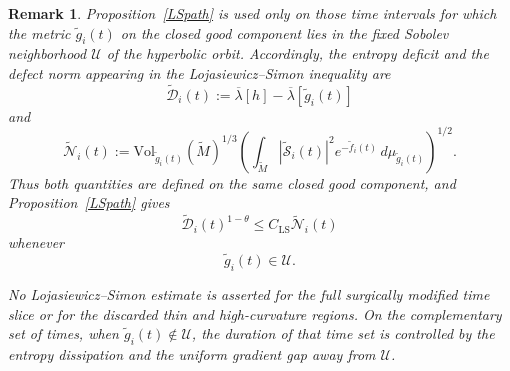 \documentclass{amsart}
\newtheorem{remark}{Remark}
\begin{document}
\begin{remark}
\label{rem:LS-only-good-tube}
Proposition~\ref{LSpath} is used only on those time intervals for which
the metric \(\widetilde g_i(t)\) on the closed good component lies in the
fixed Sobolev neighborhood \(\mathcal U\) of the hyperbolic orbit.
Accordingly, the entropy deficit and the defect norm appearing in the
Lojasiewicz--Simon inequality are
\[
        \widetilde{\mathcal D}_i(t)
        :=
        \overline\lambda[h]
        -
        \overline\lambda[\widetilde g_i(t)]
\]
and
\[
        \widetilde{\mathcal N}_i(t)
        :=
        \text{Vol}_{\widetilde g_i(t)}(\widetilde M)^{1/3}
        \left(
        \int_{\widetilde M}
        |\widetilde{\mathcal S}_i(t)|^2
        e^{-\widetilde f_i(t)}
        \,d\mu_{\widetilde g_i(t)}
        \right)^{1/2}.
\]
Thus both quantities are defined on the same closed good component, and
Proposition~\ref{LSpath} gives
\[
        \widetilde{\mathcal D}_i(t)^{1-\theta}
        \leq
        C_{\mathrm{LS}}\widetilde{\mathcal N}_i(t)
\]
whenever
\[
        \widetilde g_i(t)\in\mathcal U.
\]

\noindent No Lojasiewicz--Simon estimate is asserted for the full surgically
modified time slice or for the discarded thin and high-curvature
regions.  On the complementary set of times, when
\(\widetilde g_i(t)\notin\mathcal U\), the duration of that time set is
controlled by the entropy dissipation and the uniform gradient gap away
from \(\mathcal U\).
\end{remark}
\end{document}
